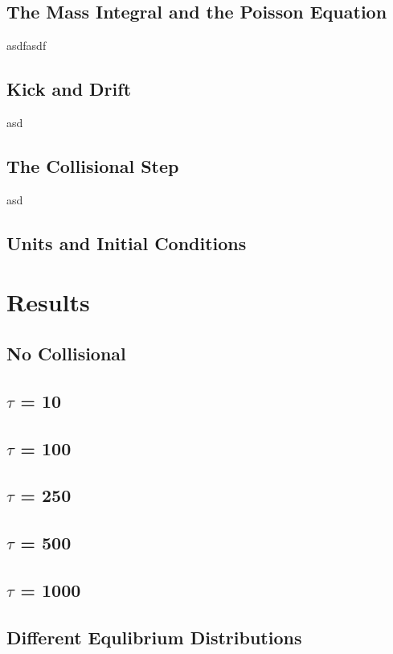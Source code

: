 \section{The Mass Integral and the Poisson Equation}
asdfasdf
\section{Kick and Drift}
asd
\section{The Collisional Step}
asd
\section{Units and Initial Conditions}




















\chapter{Results}
\section{No Collisional}
\section{$\tau$ = 10}
\section{$\tau$ = 100}
\section{$\tau$ = 250}
\section{$\tau$ = 500}
\section{$\tau$ = 1000}
\section{Different Equlibrium Distributions}